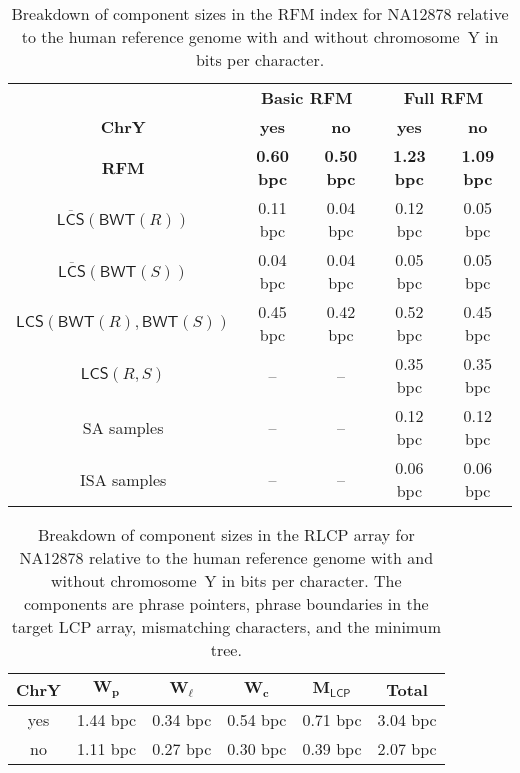 \documentclass[a4paper,11pt]{llncs}
\renewcommand{\complement}[1]{\ensuremath{\overline{ #1 }}}
\newcommand{\SA}{\textsf{SA}}
\newcommand{\ISA}{\textsf{ISA}}
\newcommand{\RFM}{\textsf{RFM}}
\newcommand{\mBWT}{\ensuremath{\mathsf{BWT}}}
\newcommand{\LCP}{\textsf{LCP}}
\newcommand{\RLCP}{\textsf{RLCP}}
\newcommand{\mLCP}{\ensuremath{\mathsf{LCP}}}
\newcommand{\mLCS}{\ensuremath{\mathsf{LCS}}}
\newcommand{\mCS}{\ensuremath{\complement{\mathsf{LCS}}}}
\begin{document}
\begin{table}
\caption{Breakdown of component sizes in the \RFM{} index for NA12878 relative to the human reference genome with and without chromosome~Y in bits per character.}\label{table:rfm components}
\setlength{\extrarowheight}{2pt}
\setlength{\tabcolsep}{3pt}
\begin{center}
\begin{tabular}{c|cc|cc}
\hline
 & \multicolumn{2}{c|}{\textbf{Basic \RFM}} & \multicolumn{2}{c}{\textbf{Full \RFM}} \\
\textbf{ChrY} & \textbf{yes} & \textbf{no} & \textbf{yes} & \textbf{no} \\
\hline
\textbf{\RFM}              & \textbf{0.60 bpc} & \textbf{0.50 bpc} & \textbf{1.23 bpc} & \textbf{1.09 bpc} \\
$\mCS(\mBWT(R))$           &          0.11 bpc &          0.04 bpc &          0.12 bpc &          0.05 bpc \\
$\mCS(\mBWT(S))$           &          0.04 bpc &          0.04 bpc &          0.05 bpc &          0.05 bpc \\
$\mLCS(\mBWT(R),\mBWT(S))$ &          0.45 bpc &          0.42 bpc &          0.52 bpc &          0.45 bpc \\
$\mLCS(R,S)$               &                -- &                -- &          0.35 bpc &          0.35 bpc \\
\SA{} samples              &                -- &                -- &          0.12 bpc &          0.12 bpc \\
\ISA{} samples             &                -- &                -- &          0.06 bpc &          0.06 bpc \\
\hline
\end{tabular}
\end{center}
\end{table}

\begin{table}
\caption{Breakdown of component sizes in the \RLCP{} array for NA12878 relative to the human reference genome with and without chromosome~Y in bits per character. The components are phrase pointers, phrase boundaries in the target \LCP{} array, mismatching characters, and the minimum tree.}\label{table:rlcp components}
\setlength{\extrarowheight}{2pt}
\setlength{\tabcolsep}{3pt}
\begin{center}
\begin{tabular}{c|cccc|c}
\hline
\textbf{ChrY} & $\mathbf{W_{p}}$  & $\mathbf{W_{\ell}}$ & $\mathbf{W_{c}}$ & $\mathbf{M_{\mLCP}}$ & \textbf{Total} \\
\hline
yes & 1.44 bpc & 0.34 bpc & 0.54 bpc & 0.71 bpc & 3.04 bpc \\
no  & 1.11 bpc & 0.27 bpc & 0.30 bpc & 0.39 bpc & 2.07 bpc \\
\hline
\end{tabular}
\end{center}
\end{table}
\end{document}
